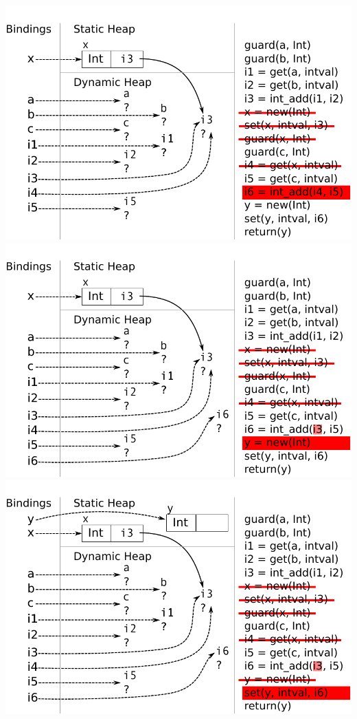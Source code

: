 \documentclass[utf8x]{beamer}
\begin{document}
\begin{frame}[plain]
{\includegraphics[scale=0.8]{figures/ex12}}
{\includegraphics[scale=0.8]{figures/ex13}}
{\includegraphics[scale=0.8]{figures/ex14}}

\end{frame}
\end{document}
